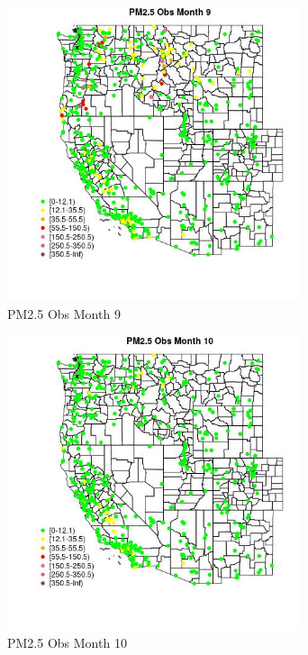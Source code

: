 \begin{figure} 
\centering  
\includegraphics[width=0.77\textwidth]{Code_Outputs/Report_ML_input_PM25_Step4_part_e_de_duplicated_aves_compiled_2019-05-14wNAs_MapObsMo9PM25_Obs.jpg} 
\caption{\label{fig:Report_ML_input_PM25_Step4_part_e_de_duplicated_aves_compiled_2019-05-14wNAsMapObsMo9PM25_Obs}PM2.5 Obs Month 9} 
\end{figure} 
 

\clearpage 

\begin{figure} 
\centering  
\includegraphics[width=0.77\textwidth]{Code_Outputs/Report_ML_input_PM25_Step4_part_e_de_duplicated_aves_compiled_2019-05-14wNAs_MapObsMo10PM25_Obs.jpg} 
\caption{\label{fig:Report_ML_input_PM25_Step4_part_e_de_duplicated_aves_compiled_2019-05-14wNAsMapObsMo10PM25_Obs}PM2.5 Obs Month 10} 
\end{figure} 
 

